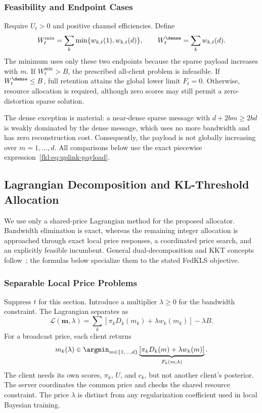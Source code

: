 \subsubsection{Feasibility and Endpoint Cases}
Require $U_t>0$ and positive channel efficiencies. Define
\begin{equation}
 W_t^{\min}=\sum_k\min\{w_{k,t}(1),w_{k,t}(d)\},\qquad
 W_t^{\dense}=\sum_kw_{k,t}(d).
 \label{fkl:eq:endpoint-costs}
\end{equation}
The minimum uses only these two endpoints because the sparse payload increases with $m$. If $W_t^{\min}>B$, the prescribed all-client problem is infeasible. If $W_t^{\dense}\le B$, full retention attains the global lower limit $F_t=0$. Otherwise, resource allocation is required, although zero scores may still permit a zero-distortion sparse solution.

The dense exception is material: a near-dense sparse message with $d+2bm\ge2bd$ is weakly dominated by the dense message, which uses no more bandwidth and has zero reconstruction cost. Consequently, the payload is not globally increasing over $m=1,\ldots,d$. All comparisons below use the exact piecewise expression~\eqref{fkl:eq:uplink-payload}.


\subsection{Lagrangian Decomposition and KL-Threshold Allocation}
\label{fkl:sec:solution}
We use only a shared-price Lagrangian method for the proposed allocator. Bandwidth elimination is exact, whereas the remaining integer allocation is approached through exact local price responses, a coordinated price search, and an explicitly feasible incumbent. General dual-decomposition and KKT concepts follow~\cite{decomposition,boyd}; the formulas below specialize them to the stated FedKLS objective.

\subsubsection{Separable Local Price Problems}
Suppress $t$ for this section. Introduce a multiplier $\lambda\ge0$ for the bandwidth constraint. The Lagrangian separates as
\begin{equation}
 \mathcal L(\mathbf m,\lambda)
 =\sum_k\left[\pi_kD_k(m_k)+\lambda w_k(m_k)\right]-\lambda B.
 \label{fkl:eq:lagrangian}
\end{equation}
For a broadcast price, each client returns
\begin{equation}
 m_k(\lambda)\in
 \argmin_{m\in\{1,\ldots,d\}}
 \underbrace{\left[\pi_kD_k(m)+\lambda w_k(m)\right]}_{F_k(m;\lambda)}.
 \label{fkl:eq:local-price}
\end{equation}
The client needs its own scores, $\pi_k$, $U$, and $c_k$, but not another client's posterior. The server coordinates the common price and checks the shared resource constraint. The price $\lambda$ is distinct from any regularization coefficient used in local Bayesian training.

